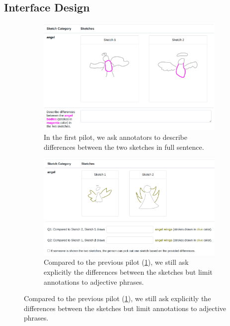 \subsection{Interface Design}
\begin{figure}[!htb]
\begin{subfigure}{\textwidth}
\centering
\includegraphics[width=.8\linewidth]{data_collection/version2/v2annofeb1.png}  
\caption{In the first pilot, we ask annotators to describe differences between the two sketches in full sentence.}
\label{v2.main_task.1.a}
\end{subfigure}
\newline
\begin{subfigure}{\textwidth}
\centering
\includegraphics[width=.8\linewidth]{data_collection/version2/v2annofeb4.png}  
\caption{Compared to the previous pilot (\ref{v2.main_task.1.a}), we still ask explicitly the differences between the sketches but limit annotations to adjective phrases.}
\label{v2.main_task.1.b}
\end{subfigure}
\end{figure}

